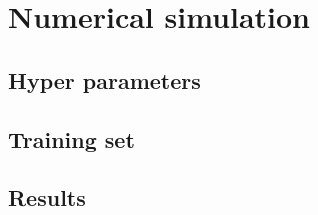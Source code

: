 \section{Numerical simulation}


\subsection{Hyper parameters}


\subsection{Training set}


\subsection{Results}























